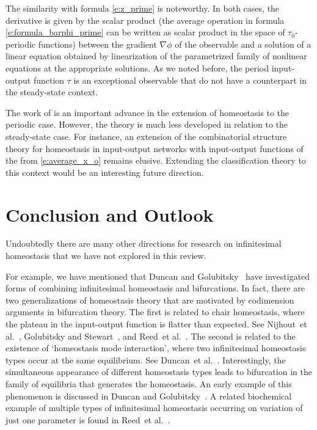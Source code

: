 \documentclass[a4paper,fleqn]{cas-dc}
\newcommand{\etal}{\textrm{et al.}}
\begin{document}
The similarity with formula \eqref{e:z_prime} is noteworthy.
In both cases, the derivative is given by the scalar product (the average operation in formula \eqref{e:formula_barphi_prime} can be written as scalar product in the space of $\tau_0$-periodic functions) between the gradient $\nabla\phi$ of the observable and a solution of a linear equation obtained by linearization of the parametrized family of nonlinear equations at the appropriate solutions.
As we noted before, the period input-output function $\tau$ is an exceptional observable that do not have a counterpart in the steady-state context.

The work of \cite{yu2022} is an important advance in the extension of homeostasis to the periodic case.
However, the theory is much less developed in relation to the steady-state case.
For instance, an extension of the combinatorial structure theory for homeostasis in input-output networks with input-output functions of the from \eqref{e:average_x_o} remains elusive. 
Extending the classification theory to this context would be an interesting future direction.

\section{Conclusion and Outlook}

Undoubtedly there are many other directions for research on infinitesimal homeostasis that we have not explored in this review.

For example, we have mentioned that Duncan and Golubitsky~\cite{duncan2019} have investigated forms of combining infinitesimal homeostasis and bifurcations.
In fact, there are two generalizations of homeostasis theory that are motivated by codimension arguments in bifurcation theory.  
The first is related to chair homeostasis, where the plateau in the input-output function is flatter than expected.
See Nijhout~\etal~\cite{nbr2014}, Golubitsky and Stewart~\cite{gs2018}, and Reed~\etal~\cite{rbgsn2017}. 
The second is related to the existence of `homeostasis mode interaction', where two infinitesimal homeostasis types occur at the same equilibrium. 
See Duncan~\etal~\cite{duncan2025}. 
Interestingly, the simultaneous appearance of different homeostasis types leads to bifurcation in the family of equilibria that generates the homeostasis.  
An early example of this phenomenon is discussed in Duncan and Golubitsky~\cite{duncan2019}.  
A related biochemical example of multiple types of infinitesimal homeostasis occurring on variation of just one parameter is found in Reed~\etal~\cite{rbgsn2017}.
\end{document}

